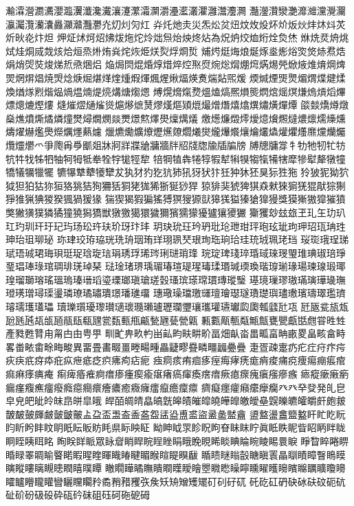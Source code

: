 瀭瀮瀯瀱瀳瀴瀶瀷瀸瀺瀻瀼瀽瀿灀灁灂灅灆灇灈灉灊灋灍
灎灐灒灓灔灖灗灙灚灛灜灟灠灡灢灥灦灨灩灪灮灱灲灳灴
灷灹灺灻災炁炂炃炄炆炇炈炋炌炍炏炐炑炓炗炘炚炛炞炟
炠炡炢炣炤炥炦炧炨炩炪炰炲炴炵炶為炾炿烄烅烆烇烉烋
烌烍烎烐烑烒烓烔烕烖烗烚烜烝烞烠烡烢烣烥烪烮烰烱烲
烳烵烶烸烺烻烼烾烿焀焁焂焃焄焅焆焇焈焋焌焍焎焏焑焒
焔焗焛焜焝焞焟焠焢焣焤焥焧焨焩焪焫焬焭焮焲焳焴焵焷
焸焹焺焻焼焽焾焿煀煁煂煃煄煆煇煈煋煍煏煐煑煓煔煕煖
煗煘煙煚煛煝煟煠煡煣煥煪煫煭煯煰煱煴煵煶煷煹煻煼煾
煿熀熁熂熃熅熆熇熈熉熋熌熍熎熐熑熓熕熖熚熛熜熝熞熡
熢熣熤熥熦熧熩熪熫熭熮熯熰熲熴熶熷熸熺熻熼熽熿燀燂
燄燅燆燇燉燊燋燌燍燏燐燑燓燖燗燘燚燛燝燞燡燢燣燤燨
燩燪燫燬燯燰燱燲燳燵燶燷燸燺燻燽燿爀爁爂爃爄爅爇爈
爉爊爋爌爎爏爑爒爓爔爕爖爗爘爙爚爜爞爟爠爡爢爣爤爥
爦爧爩爫爭爮爯爳爴爼牀牁牂牃牄牅牆牉牊牋牎牏牐牑牓
牔牕牗牚牜牞牠牣牤牥牨牪牫牬牭牰牱牳牴牶牷牸牻牼犂
犃犅犆犇犈犉犌犎犐犑犓犔犕犗犘犙犚犛犜犝犞犠犡犣犤
犥犦犨犩犪犫犮犱犲犳犵犺犻犼犽犾犿狅狆狇狉狊狋狌狏
狑狓狔狕狖狘狚狛狜狝狟狢狣狤狥狦狧狪狫狵狶狾狿猀猂
猄猅猆猇猈猉猋猌猍猏猐猑猒猔猘猙猚猟猠猣猤猦猧猨猭
猯猰猲猳猵猺猼猽獀獂獃獆獇獈獉獊獋獌獎獏獑獓獔獕獖
獘獙獚獛獜獝獞獟獡獢獣獤獥獦獧獩獮獱獳獴獶獹獽獿玁
玂玃玅玆玈玊玌玍玏玐玒玓玔玕玗玘玙玚玜玝玞玠玡玣玤
玥玦玧玨玪玬玭玱玴玵玶玸玹玼玽玾玿珁珃珄珅珆珇珋珌
珎珒珓珔珕珖珗珘珚珛珜珝珟珡珢珣珤珦珨珪珫珬珮珯珰
珱珳珴珵珶珷珸珹珺珻珼珽珿琀琁琂琄琇琈琋琌琍琎琑琒
琓琔琕琖琗琘琙琜琝琞琟琠琡琣琤琧琩琫琭琯琱琲琷琸琹
琺琻琽琾瑀瑂瑃瑄瑅瑆瑇瑈瑉瑊瑌瑍瑎瑏瑐瑑瑒瑓瑔瑖瑘
瑝瑠瑡瑢瑤瑥瑦瑧瑨瑫瑬瑮瑯瑱瑲瑳瑴瑵瑸瑹瑺瑻瑼瑽瑿
璂璄璅璆璈璊璌璍璏璑璒璓璔璕璖璗璘璙璚璛璝璟璠璡璢
璤璥璪璫璬璭璮璯璱璲璳璴璵璶璷璸璹璻璼璾璿瓀瓁瓂瓃
瓄瓅瓆瓇瓈瓉瓋瓌瓍瓎瓐瓑瓓瓕瓖瓗瓘瓙瓛瓝瓟瓡瓥瓧瓨
瓩瓪瓫瓬瓭瓰瓱瓲瓳瓵瓸瓹瓺瓻瓼瓽瓾甀甁甂甃甅甆甇甈
甉甊甋甎甐甒甔甕甖甗甛甝甞甠甡產甤甦甧甪甮甴甶甹甼
甽甿畁畂畃畄畆畇畉畊畍畐畑畒畓畕畖畗畘畞畟畠畡畣畤
畧畨畩畬畭畮畯異畱畳畵畷畺畻畼畽畾疀疁疂疄疅疈疉疊
疌疍疎疐疓疕疘疛疜疞疢疦疧疨疩疪疭疶疷疺疻疿痀痁痆
痋痌痎痏痐痑痓痗痚痜痝痟痠痡痥痩痬痭痮痯痲痳痵痶痷
痸痺痻痽痾瘄瘆瘇瘈瘉瘎瘏瘑瘒瘓瘔瘖瘚瘜瘝瘣瘨瘬瘮瘯
瘱瘲瘶瘷瘹瘺瘽癁癄癅癈癊癋癎癏癐癑癒癓癕癗癙癚癛癝
癠癡癦癨癪癳癴癵⽨癶癷癹発癿皀皁皃皅皉皊皌皍皏皐皒
皔皕皗皘皛皜皝皞皟皠皡皢皣皥皦皧皨皩皪皫皬皭皯皰皳
皵皶皷皹皻皼皽皾盀盁盃盄盇盉盋盌盓盕盙盚盜盝盠盢盦
盨盩盪盫盬盭盰盳盵盶盷盺盻盽盿眀眂眃眅眆眊県眎眏眐
眑眒眓眔眕眖眗眘眛眜眝眞眡眣眤眥眧眪眫眬眮眰眱眲眳
眴眹眻眽眾眿睂睄睅睆睈睉睊睋睌睍睎睒睓睔睕睖睗睘睙
睜睝睟睠睤睧睩睪睭睮睯睰睱睲睳睴睵睶睷睸睺睻睼瞁瞂
瞃瞆瞇瞈瞉瞊瞋瞏瞐瞓瞔瞕瞖瞗瞙瞚瞛瞜瞝瞡瞣瞤瞦瞨瞫
瞮瞯瞱瞲瞴瞶瞷瞸瞹瞺瞾矀矁矂矃矄矅矆矈矉矊矋矌矎矏
矐矑矒矓矔矕矖矘矙矝矞矟矠矡矤矦矨矪矰矱矲矴矵矷矹
矺矻矼砃砄砅砆砇砈砊砋砎砏砐砓砕砙砛砞砠砡砢砤砨砪
